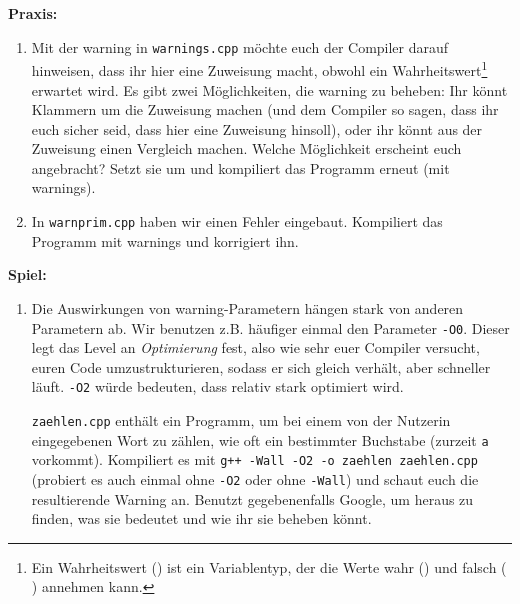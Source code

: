 \textbf{Praxis:}
\begin{enumerate}[resume]
    \item Mit der warning in \texttt{warnings.cpp} möchte euch der Compiler
        darauf hinweisen, dass ihr hier eine Zuweisung macht, obwohl ein
        Wahrheitswert\footnote{Ein Wahrheitswert () ist ein
        Variablentyp, der die Werte wahr () und falsch (
        ) annehmen kann.}
        erwartet wird. Es gibt zwei Möglichkeiten, die warning zu
        beheben: Ihr könnt Klammern um die Zuweisung machen (und dem Compiler
        so sagen, dass ihr euch sicher seid, dass hier eine Zuweisung hinsoll),
        oder ihr könnt aus der Zuweisung einen Vergleich machen. Welche
        Möglichkeit erscheint euch angebracht? Setzt sie um und kompiliert das
        Programm erneut (mit warnings).
    \item In \texttt{warnprim.cpp} haben wir einen Fehler eingebaut. Kompiliert
        das Programm mit warnings und korrigiert ihn.
\end{enumerate}


\textbf{Spiel:}
\begin{enumerate}
    \item Die Auswirkungen von warning-Parametern hängen stark von anderen
        Parametern ab. Wir benutzen z.B. häufiger einmal den Parameter
        \texttt{-O0}. Dieser legt das Level an \emph{Optimierung} fest, also
        wie sehr euer Compiler versucht, euren Code umzustrukturieren, sodass
        er sich gleich verhält, aber schneller läuft. \texttt{-O2} würde
        bedeuten, dass relativ stark optimiert wird.

        \texttt{zaehlen.cpp} enthält ein Programm, um bei einem von der Nutzerin eingegebenen Wort zu zählen, wie oft ein bestimmter Buchstabe (zurzeit \texttt{a} vorkommt).
        Kompiliert es mit \texttt{g++ -Wall -O2 -o zaehlen zaehlen.cpp} (probiert es auch einmal ohne \texttt{-O2} oder ohne \texttt{-Wall}) und schaut euch die resultierende Warning an.
        Benutzt gegebenenfalls Google, um heraus zu finden, was sie bedeutet und wie ihr sie beheben könnt.
\end{enumerate}

